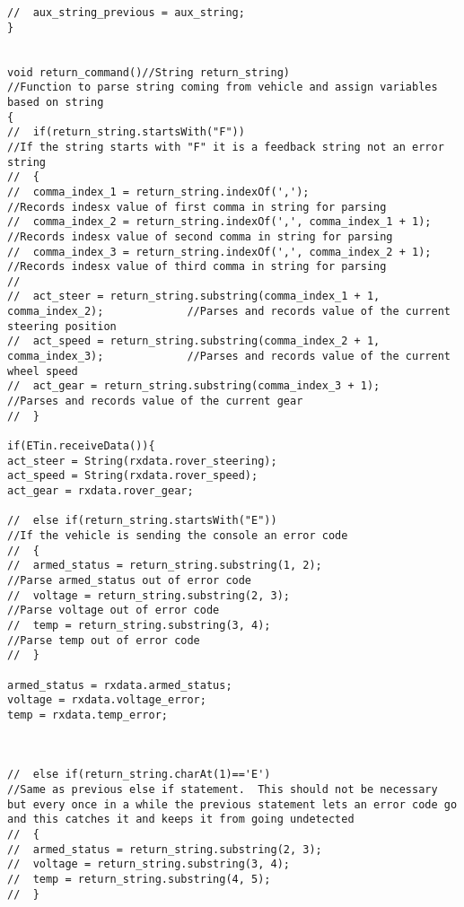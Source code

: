 \begin{lstlisting}[breaklines=true,basicstyle=\tiny]
//  aux_string_previous = aux_string;
}


void return_command()//String return_string)                                            //Function to parse string coming from vehicle and assign variables based on string
{
//  if(return_string.startsWith("F"))                                                //If the string starts with "F" it is a feedback string not an error string
//  {
//  comma_index_1 = return_string.indexOf(',');                                        //Records indesx value of first comma in string for parsing
//  comma_index_2 = return_string.indexOf(',', comma_index_1 + 1);                     //Records indesx value of second comma in string for parsing
//  comma_index_3 = return_string.indexOf(',', comma_index_2 + 1);                     //Records indesx value of third comma in string for parsing
//  
//  act_steer = return_string.substring(comma_index_1 + 1, comma_index_2);             //Parses and records value of the current steering position
//  act_speed = return_string.substring(comma_index_2 + 1, comma_index_3);             //Parses and records value of the current wheel speed
//  act_gear = return_string.substring(comma_index_3 + 1);                             //Parses and records value of the current gear
//  }

if(ETin.receiveData()){
act_steer = String(rxdata.rover_steering);
act_speed = String(rxdata.rover_speed);
act_gear = rxdata.rover_gear;

//  else if(return_string.startsWith("E"))                                             //If the vehicle is sending the console an error code
//  {
//  armed_status = return_string.substring(1, 2);                                      //Parse armed_status out of error code
//  voltage = return_string.substring(2, 3);                                           //Parse voltage out of error code
//  temp = return_string.substring(3, 4);                                              //Parse temp out of error code
//  }

armed_status = rxdata.armed_status;
voltage = rxdata.voltage_error;
temp = rxdata.temp_error;



//  else if(return_string.charAt(1)=='E')                                              //Same as previous else if statement.  This should not be necessary but every once in a while the previous statement lets an error code go and this catches it and keeps it from going undetected
//  {
//  armed_status = return_string.substring(2, 3);
//  voltage = return_string.substring(3, 4);
//  temp = return_string.substring(4, 5);
//  }


\end{lstlisting}
